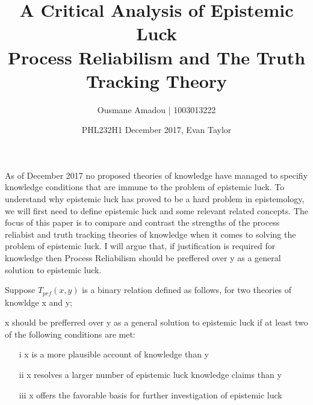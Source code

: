 \documentclass{article}
\title{%
  A Critical Analysis of Epistemic Luck \\
  \large Process Reliabilism and The Truth Tracking Theory }
\author{Ousmane Amadou | 1003013222}
\date{PHL232H1 December 2017, Evan Taylor}
\begin{document}
\maketitle

As of December 2017 no proposed theories of knowledge have managed to specifiy knowledge conditions that are immune to the problem of epistemic luck. To understand why epistemic luck has proved to be a hard problem in epistemology, we will first need to define epistemic luck and some relevant related concepts. The focus of this paper is to compare and contrast the strengths of the process reliabist and truth tracking theories of knowledge when it comes to solving the problem of epistemic luck. I will argue that, if justification is required for knowledge then Process Reliabilism should be preffered over y as a general solution to epistemic luck.

Suppose $T_{prf}(x, y)$ is a binary relation defined as follows, for two theories of knowldge x and y;
\begin{center}
    x should be prefferred over y as a general solution to epistemic luck if at least two of the following conditions are met:
    \begin{enumerate}
        \item[i] x is a more plausible account of knowledge than y 
        \item[ii] x resolves a larger number of epistemic luck knowledge claims than y
        \item[iii] x offers the favorable basis for further investigation of epistemic luck
    \end{enumerate}
\end{center}


\end{document}
